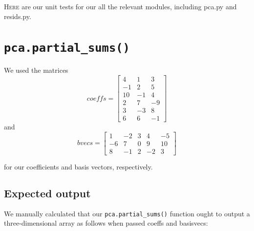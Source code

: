 \documentclass{article}
\begin{document}
\textsc{Here} are our unit tests for our all the relevant modules,
including pca.py and resids.py.
\section{\texttt{pca.partial\_sums()}}
\label{sec:partialsums}

We used the matrices
\[coeffs = \left[ \begin{array}{ccc}
4 & 1 & 3 \\
-1 & 2 & 5 \\
10 & -1 & 4 \\
2 & 7 & -9 \\
3 & -3 & 8 \\
6 & 6 & -1
\end{array} \right] \]
and
\[bvecs = \left[ \begin{array}{ccccc}
1 & -2 & 3 & 4 & -5 \\
-6 & 7 & 0 & 9 & 10 \\
8 & -1 & 2 & -2 & 3
\end{array} \right] \]

for our coefficients and basis vectors, respectively.

\subsection{Expected output}
\label{sec:manual}

We manually calculated that our \verb|pca.partial_sums()| function
ought to output a three-dimensional array as follows when passed
coeffs and basisvecs:
\end{document}
